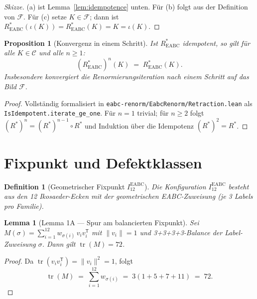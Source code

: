 \documentclass[11pt,a4paper]{article}
\newtheorem{definition}{Definition}
\newtheorem{proposition}{Proposition}
\newtheorem{lemma}{Lemma}
\begin{document}
\begin{proof}[Skizze]
(a) ist Lemma~\ref{lem:idempotence} unten.
Für (b) folgt aus der Definition von $\mathcal{F}$.
Für (c) setze $K\in\mathcal{F}$; dann ist
$R^*_{\mathrm{EABC}}(\iota(K))=R^*_{\mathrm{EABC}}(K)=K=\iota(K)$.
\end{proof}

\begin{proposition}[Konvergenz in einem Schritt]
\label{prop:convergence}
Ist $R^*_{\mathrm{EABC}}$ idempotent, so gilt für alle $K\in\mathcal{C}$ und
alle $n\ge 1$:
\[
  (R^*_{\mathrm{EABC}})^n(K) \;=\; R^*_{\mathrm{EABC}}(K).
\]
Insbesondere konvergiert die Renormierungsiteration nach \emph{einem} Schritt
auf das Bild $\mathcal{F}$.
\end{proposition}

\begin{proof}
Vollständig formalisiert in \texttt{eabc-renorm/EabcRenorm/Retraction.lean}
als \texttt{IsIdempotent.iterate\_ge\_one}.
Für $n=1$ trivial; für $n\ge 2$ folgt $(R^*)^n=(R^*)^{n-1}\circ R^*$
und Induktion über die Idempotenz $(R^*)^2=R^*$.
\end{proof}

\section{Fixpunkt und Defektklassen}

\begin{definition}[Geometrischer Fixpunkt $I_{12}^{\mathrm{EABC}}$]
Die Konfiguration $I_{12}^{\mathrm{EABC}}$ besteht aus den 12 Ikosaeder-Ecken
mit der geometrischen EABC-Zuweisung (je 3 Labels pro Familie).
\end{definition}

\begin{lemma}[Lemma 1A — Spur am balancierten Fixpunkt]
\label{lem:trace}
Sei $M(\sigma)=\sum_{i=1}^{12} w_{\sigma(i)}\, v_i v_i^{\mathsf T}$ mit $\|v_i\|=1$
und 3+3+3+3-Balance der Label-Zuweisung $\sigma$.
Dann gilt $\operatorname{tr}(M)=72$.
\end{lemma}

\begin{proof}
Da $\operatorname{tr}(v_i v_i^{\mathsf T})=\|v_i\|^2=1$, folgt
\[
  \operatorname{tr}(M)
  \;=\;
  \sum_{i=1}^{12} w_{\sigma(i)}
  \;=\;
  3(1+5+7+11)
  \;=\;
  72.
\]
\end{proof}
\end{document}
